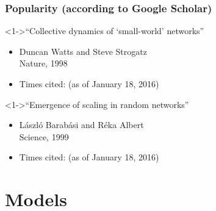 \begin{frame}
  \frametitle{Popularity (according to Google Scholar)}

  \begin{block}<1->{``Collective dynamics of `small-world' networks''\cite{watts1998a}}
    \begin{itemize}
    \item[] 
      Duncan Watts and Steve Strogatz\\
      Nature, 1998
    \item[] 
      {Times cited:  }
      {\tiny(as of January 18, 2016)}
      \end{itemize}
    \end{block}

  \begin{block}<1->{``Emergence of scaling in random networks''\cite{barabasi1999a}}
    \begin{itemize}
    \item[] 
      L\'{a}szl\'{o} Barab\'{a}si and R\'{e}ka Albert\\
      Science, 1999
    \item[] 
      {Times cited: }
      {\tiny(as of January 18, 2016)}
    \end{itemize}
  \end{block}
\end{frame}

\section{Models}


